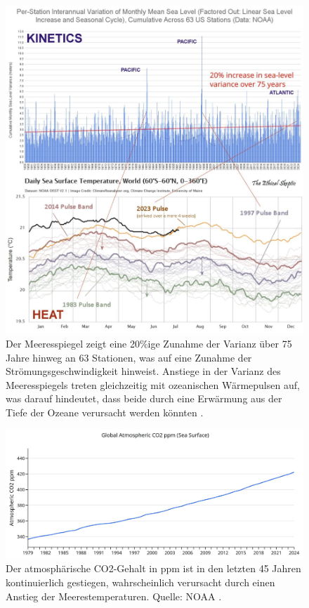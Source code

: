 \documentclass[10pt,twocolumn,letterpaper]{article}
\begin{document}
\begin{figure}[t]
\begin{center}
\includegraphics[width=1\textwidth]{sealevel.jpeg}
\end{center}
   \caption{Der Meeresspiegel zeigt eine 20\%ige Zunahme der Varianz über 75 Jahre hinweg an 63 Stationen, was auf eine Zunahme der Strömungsgeschwindigkeit hinweist. Anstiege in der Varianz des Meeresspiegels treten gleichzeitig mit ozeanischen Wärmepulsen auf, was darauf hindeutet, dass beide durch eine Erwärmung aus der Tiefe der Ozeane verursacht werden könnten \cite{2,129}.}
\label{fig:22}
\end{figure}

\begin{figure}[t]
\begin{center}
\includegraphics[width=1\textwidth]{co2.jpg}
\end{center}
   \caption{Der atmosphärische CO2-Gehalt in ppm ist in den letzten 45 Jahren kontinuierlich gestiegen, wahrscheinlich verursacht durch einen Anstieg der Meerestemperaturen. Quelle: NOAA \cite{148,129}.}
\label{fig:23}
\end{figure}
\end{document}

